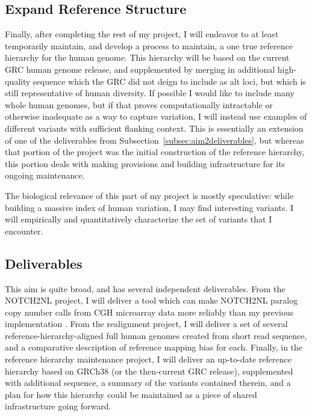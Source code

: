 \documentclass[11pt,proposal]{ucthesis}
\begin{document}
\subsection{Expand Reference Structure}
\label{subsec:aim3maintenance}

Finally, after completing the rest of my project, I will endeavor to at least temporarily maintain, and develop a process to maintain, a one true reference hierarchy for the human genome. This hierarchy will be based on the current GRC human genome release, and supplemented by merging in additional high-quality sequence which the GRC did not deign to include as alt loci, but which is still representative of human diversity. If possible I would like to include many whole human genomes, but if that proves computationally intractable or otherwise inadequate as a way to capture variation, I will instead use examples of different variants with sufficient flanking context. This is essentially an extension of one of the deliverables from Subsection~\ref{subsec:aim2deliverables}, but whereas that portion of the project was the initial construction of the reference hierarchy, this portion deals with making provisions and building infrastructure for its ongoing maintenance.

The biological relevance of this part of my project is mostly speculative: while building a massive index of human variation, I may find interesting variants. I will empirically and quantitatively characterize the set of variants that I encounter.

\subsection{Deliverables}

This aim is quite broad, and has several independent deliverables. From the NOTCH2NL project, I will deliver a tool which can make NOTCH2NL paralog copy number calls from CGH microarray data more reliably than my previous implementation \cite{jacobs2014recently}. From the realignment project, I will deliver a set of several reference-hierarchy-aligned full human genomes created from short read sequence, and a comparative description of reference mapping bias for each. Finally, in the reference hierarchy maintenance project, I will deliver an up-to-date reference hierarchy based on GRCh38 (or the then-current GRC release), supplemented with additional sequence, a summary of the variants contained therein, and a plan for how this hierarchy could be maintained as a piece of shared infrastructure going forward.
\end{document}
